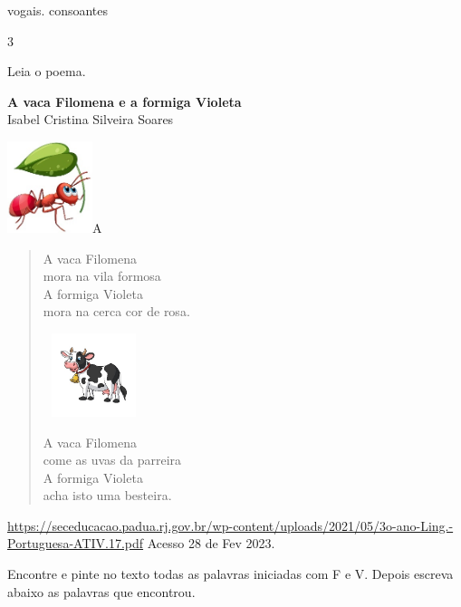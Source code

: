 {%

vogais. consoantes


\num{3}

Leia o poema.

\textbf{A vaca Filomena e a formiga Violeta}\\
Isabel Cristina Silveira Soares

\includegraphics[width=0.97986in,height=1.05208in]{media/image5.jpeg}A

\begin{verse}
A vaca Filomena\\
mora na vila formosa\\
A formiga Violeta\\
mora na cerca cor de rosa.

\includegraphics[width=1.16127in,height=0.95833in]{media/image6.jpeg}

A vaca Filomena\\
come as uvas da parreira\\
A formiga Violeta\\
acha isto uma besteira.
\end{verse}

\url{https://seceducacao.padua.rj.gov.br/wp-content/uploads/2021/05/3o-ano-Ling.-Portuguesa-ATIV.17.pdf}
Acesso 28 de Fev 2023.

Encontre e pinte no texto todas as palavras iniciadas com F e V. 
Depois escreva abaixo as palavras que encontrou.



}
